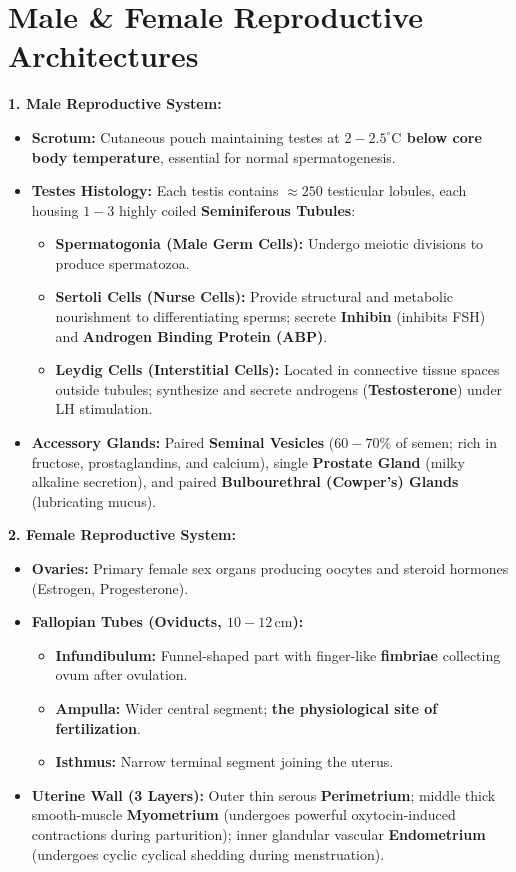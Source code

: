 \documentclass[10pt,twoside,openright]{book}
\begin{document}
\section{Male \& Female Reproductive Architectures}

\begin{conceptbox}
\textbf{1. Male Reproductive System:}
\begin{itemize}[leftmargin=*]
  \item \textbf{Scrotum:} Cutaneous pouch maintaining testes at \textbf{$2-2.5^\circ\mathrm{C}$ below core body temperature}, essential for normal spermatogenesis.
  \item \textbf{Testes Histology:} Each testis contains $\approx 250$ testicular lobules, each housing $1-3$ highly coiled \textbf{Seminiferous Tubules}:
  \begin{itemize}
    \item \textbf{Spermatogonia (Male Germ Cells):} Undergo meiotic divisions to produce spermatozoa.
    \item \textbf{Sertoli Cells (Nurse Cells):} Provide structural and metabolic nourishment to differentiating sperms; secrete \textbf{Inhibin} (inhibits FSH) and \textbf{Androgen Binding Protein (ABP)}.
    \item \textbf{Leydig Cells (Interstitial Cells):} Located in connective tissue spaces outside tubules; synthesize and secrete androgens (\textbf{Testosterone}) under LH stimulation.
  \end{itemize}
  \item \textbf{Accessory Glands:} Paired \textbf{Seminal Vesicles} ($60-70\%$ of semen; rich in fructose, prostaglandins, and calcium), single \textbf{Prostate Gland} (milky alkaline secretion), and paired \textbf{Bulbourethral (Cowper's) Glands} (lubricating mucus).
\end{itemize}

\textbf{2. Female Reproductive System:}
\begin{itemize}[leftmargin=*]
  \item \textbf{Ovaries:} Primary female sex organs producing oocytes and steroid hormones (Estrogen, Progesterone).
  \item \textbf{Fallopian Tubes (Oviducts, $10-12\,\mathrm{cm}$):}
  \begin{itemize}
    \item \textbf{Infundibulum:} Funnel-shaped part with finger-like \textbf{fimbriae} collecting ovum after ovulation.
    \item \textbf{Ampulla:} Wider central segment; \textbf{the physiological site of fertilization}.
    \item \textbf{Isthmus:} Narrow terminal segment joining the uterus.
  \end{itemize}
  \item \textbf{Uterine Wall (3 Layers):} Outer thin serous \textbf{Perimetrium}; middle thick smooth-muscle \textbf{Myometrium} (undergoes powerful oxytocin-induced contractions during parturition); inner glandular vascular \textbf{Endometrium} (undergoes cyclic cyclical shedding during menstruation).
\end{itemize}
\end{conceptbox}
\end{document}
